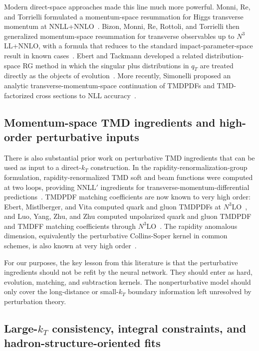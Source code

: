 \documentclass[11pt]{article}
\begin{document}
Modern direct-space approaches made this line much more powerful. Monni, Re, and
Torrielli formulated a momentum-space resummation for Higgs transverse momentum at
NNLL+NNLO~\cite{MonniReTorrielli2016}. Bizon, Monni, Re, Rottoli, and Torrielli then
generalized momentum-space resummation for transverse observables up to
$N^3$LL+NNLO, with a formula that reduces to the standard impact-parameter-space result
in known cases~\cite{BizonMonniReRottoliTorrielli2018}. Ebert and Tackmann developed a
related distribution-space RG method in which the singular plus distributions in $q_T$ are
treated directly as the objects of evolution~\cite{EbertTackmann2017}. More recently,
Simonelli proposed an analytic transverse-momentum-space continuation of TMDPDFs and
TMD-factorized cross sections to NLL accuracy~\cite{Simonelli2026}.

\subsection{Momentum-space TMD ingredients and high-order perturbative inputs}

There is also substantial prior work on perturbative TMD ingredients that can be used as
input to a direct-$k_T$ construction. In the rapidity-renormalization-group formulation,
rapidity-renormalized TMD soft and beam functions were computed at two loops, providing
NNLL$'$ ingredients for transverse-momentum-differential predictions~\cite{LuebbertOredssonStahlhofen2016}.
TMDPDF matching coefficients are now known to very high order: Ebert, Mistlberger, and
Vita computed quark and gluon TMDPDFs at $N^3$LO~\cite{EbertMistlbergerVita2020},
and Luo, Yang, Zhu, and Zhu computed unpolarized quark and gluon TMDPDF and TMDFF
matching coefficients through $N^3$LO~\cite{LuoYangZhuZhu2021}. The rapidity anomalous
dimension, equivalently the perturbative Collins-Soper kernel in common schemes, is also
known at very high order~\cite{MoultZhuZhu2022,DuhrMistlbergerVita2022}.

For our purposes, the key lesson from this literature is that the perturbative ingredients
should not be refit by the neural network. They should enter as hard, evolution, matching,
and subtraction kernels. The nonperturbative model should only cover the long-distance or
small-$k_T$ boundary information left unresolved by perturbation theory.

\subsection{Large-$k_T$ consistency, integral constraints, and hadron-structure-oriented fits}
\end{document}
